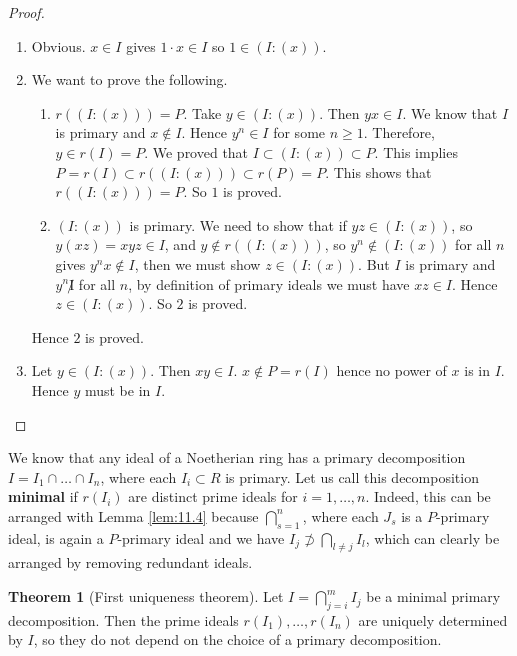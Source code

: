 \documentclass{article}
\newcommand{\rb}[1]{\left( #1 \right)}
\theoremstyle{definition}\newtheorem{definition}{Definition}[section]
\theoremstyle{definition}\newtheorem{remark}[definition]{Remark}
\theoremstyle{definition}\newtheorem*{example}{Example}
\theoremstyle{definition}\newtheorem*{note}{Note}
\newtheorem{theorem}[definition]{Theorem}
\begin{document}
\begin{proof}
\hfill
\begin{enumerate}
\item Obvious. $ x \in I $ gives $ 1 \cdot x \in I $ so $ 1 \in \rb{I : \rb{x}} $.
\item We want to prove the following.
\begin{enumerate}
\item $ r\rb{\rb{I : \rb{x}}} = P $. Take $ y \in \rb{I : \rb{x}} $. Then $ yx \in I $. We know that $ I $ is primary and $ x \notin I $. Hence $ y^n \in I $ for some $ n \ge 1 $. Therefore, $ y \in r\rb{I} = P $. We proved that $ I \subset \rb{I : \rb{x}} \subset P $. This implies $ P = r\rb{I} \subset r\rb{\rb{I : \rb{x}}} \subset r\rb{P} = P $. This shows that $ r\rb{\rb{I : \rb{x}}} = P $. So $ 1 $ is proved.
\item $ \rb{I : \rb{x}} $ is primary. We need to show that if $ yz \in \rb{I : \rb{x}} $, so $ y\rb{xz} = xyz \in I $, and $ y \notin r\rb{\rb{I : \rb{x}}} $, so $ y^n \notin \rb{I : \rb{x}} $ for all $ n $ gives $ y^nx \notin I $, then we must show $ z \in \rb{I : \rb{x}} $. But $ I $ is primary and $ y^n \not I $ for all $ n $, by definition of primary ideals we must have $ xz \in I $. Hence $ z \in \rb{I : \rb{x}} $. So $ 2 $ is proved.
\end{enumerate}
Hence $ 2 $ is proved.
\item Let $ y \in \rb{I : \rb{x}} $. Then $ xy \in I $. $ x \notin P = r\rb{I} $ hence no power of $ x $ is in $ I $. Hence $ y $ must be in $ I $.
\end{enumerate}
\end{proof}

We know that any ideal of a Noetherian ring has a primary decomposition $ I = I_1 \cap \dots \cap I_n $, where each $ I_i \subset R $ is primary. Let us call this decomposition \textbf{minimal} if $ r\rb{I_i} $ are distinct prime ideals for $ i = 1, \dots, n $. Indeed, this can be arranged with Lemma \ref{lem:11.4} because $ \bigcap_{s = 1}^n $, where each $ J_s $ is a $ P $-primary ideal, is again a $ P $-primary ideal and we have $ I_j \not\supset \bigcap_{l \ne j} I_l $, which can clearly be arranged by removing redundant ideals.

\begin{theorem}[First uniqueness theorem]
Let $ I = \bigcap_{j = i}^m I_j $ be a minimal primary decomposition. Then the prime ideals $ r\rb{I_1}, \dots, r\rb{I_n} $ are uniquely determined by $ I $, so they do not depend on the choice of a primary decomposition.
\end{theorem}
\end{document}
